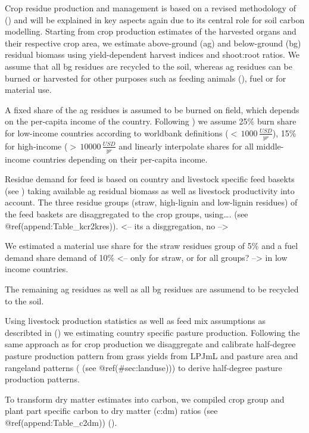 \documentclass[gc, manuscript]{copernicus}
\begin{document}
Crop residue production and management is based on a revised methodology
of (\citep{bodirsky2012}) and will be explained in key aspects again due
to its central role for soil carbon modelling. Starting from crop
production estimates of the harvested organs and their respective crop
area, we estimate above-ground (ag) and below-ground (bg) residual
biomass using yield-dependent harvest indices and shoot:root ratios. We
assume that all bg residues are recycled to the soil, whereas ag
residues can be burned or harvested for other purposes such as feeding
animals (\citep{weindl}), fuel or for material use.

A fixed share of the ag residues is assumed to be burned on field, which
depends on the per-capita income of the country. Following
\citep{smil1999}) we assume 25\% burn share for low-income countries
according to worldbank definitions (\(<\,1000\,\tfrac{USD}{yr}\)), 15\%
for high-income (\(>\,10000\,\tfrac{USD}{yr}\) and linearly interpolate
shares for all middle-income countries depending on their per-capita
income.

Residue demand for feed is based on country and livestock specific feed
basekts (see \citep{weindl}) taking available ag residual biomass as
well as livestock productivity into account. The three residue groups
(straw, high-lignin and low-lignin residues) of the feed baskets are
disaggregated to the crop groups, using\ldots. (see
@ref(append:Table\_kcr2kres)). \textless-- its a disggregation, no
--\textgreater{}

We estimated a material use share for the straw residues group of 5\%
and a fuel demand share demand of 10\% \textless-- only for straw, or
for all groups? --\textgreater{} in low income countries.

The remaining ag residues as well as all bg residues are assumend to be
recycled to the soil.

Using livestock production statistics as well as feed mix assumptions as
describted in (\citep{weindl}) we estimating country specific pasture
production. Following the same approach as for crop production we
disaggregate and calibrate half-degree pasture production pattern from
grass yields from LPJmL and pasture area and rangeland patterns ( (see
@ref(\#sec:landuse))) to derive half-degree pasture production patterns.

To transform dry matter estimates into carbon, we compiled crop group
and plant part specific carbon to dry matter (c:dm) ratios (see
@ref(append:Table\_c2dm)) (\citet{Ma2018}).
\end{document}

